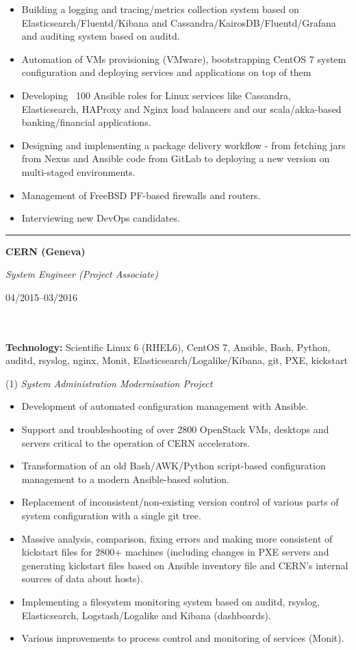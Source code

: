 \documentclass[$fontsize$, a4paper]{article}
\newcommand\textbox[1]{%
  \parbox{.333\textwidth}{#1}%
}
\begin{document}
\vspace{5pt}
\begin{itemize}
  \item Building a logging and tracing/metrics collection system based on Elasticsearch/Fluentd/Kibana and Cassandra/KairosDB/Fluentd/Grafana and auditing system based on auditd.
  \item Automation of VMs provisioning (VMware), bootstrapping CentOS 7 system configuration and deploying services and applications on top of them
  \item Developing ~100 Ansible roles for Linux services like Cassandra, Elasticsearch, HAProxy and Nginx load balancers and our scala/akka-based banking/financial applications.
  \item Designing and implementing a package delivery workflow - from fetching jars from Nexus and Ansible code from GitLab to deploying a new version on multi-staged environments.
  \item Management of FreeBSD PF-based firewalls and routers.
  \item Interviewing new DevOps candidates.
\end{itemize}


\noindent\rule[0.5ex]{\linewidth}{1pt}

\noindent\textbox{\textbf{\textsc{CERN} (Geneva)}\hfill}\textbox{\hfil \emph{System Engineer (Project Associate)}\hfil}\textbox{\hfill 04/2015--03/2016}\\\\
\textbf{Technology:} Scientific Linux 6 (RHEL6), CentOS 7, Ansible, Bash, Python, auditd, rsyslog, nginx, Monit, Elasticsearch/Logalike/Kibana, git, PXE, kickstart

\vspace{5pt}
(1) \emph{System Administration Modernisation Project}
\begin{itemize}
  \item Development of automated configuration management with Ansible.
  \item Support and troubleshooting of over 2800 OpenStack VMs, desktops and servers critical to the operation of CERN accelerators.
  \item Transformation of an old Bash/AWK/Python script-based configuration management to a modern Ansible-based solution.
  \item Replacement of inconsistent/non-existing version control of various parts of system configuration with a single git tree.
  \item Massive analysis, comparison, fixing errors and making more consistent of kickstart files for 2800+ machines (including changes in PXE servers and generating kickstart files based on Ansible inventory file and CERN's internal sources of data about hosts).
  \item Implementing a filesystem monitoring system based on auditd, rsyslog, Elasticsearch, Logstash/Logalike and Kibana (dashboards).
  \item Various improvements to process control and monitoring of services (Monit).
\end{itemize}
\end{document}
